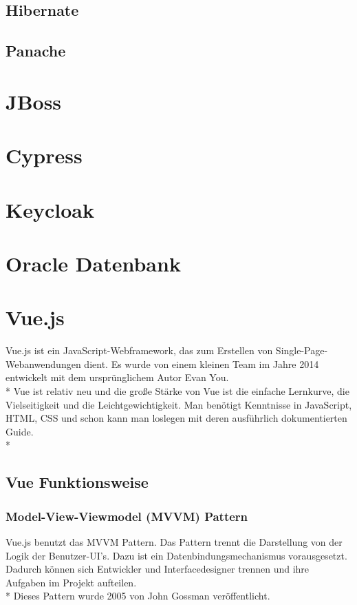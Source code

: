 \subsection{Hibernate}

\subsection{Panache}

\section{JBoss}

\section{Cypress}

\section{Keycloak}
\author{Benjamin Besic}

\section{Oracle Datenbank}

\section{Vue.js}
\author{Benjamin Besic}
Vue.js ist ein JavaScript-Webframework, das zum Erstellen von Single-Page-Webanwendungen dient. 
Es wurde von einem kleinen Team im Jahre 2014 entwickelt mit dem ursprünglichem Autor Evan You.\\* Vue ist relativ neu und die große Stärke
von Vue ist die einfache Lernkurve, die Vielseitigkeit und die Leichtgewichtigkeit. Man benötigt Kenntnisse in JavaScript, HTML, CSS und schon kann man loslegen
mit deren ausführlich dokumentierten Guide\cite{VueGuide}. \cite{VueWissen} \cite{VueWiki}\\*

\subsection{Vue Funktionsweise}

\subsubsection{Model-View-Viewmodel (MVVM) Pattern }
Vue.js benutzt das MVVM Pattern. Das Pattern trennt die Darstellung von der Logik der Benutzer-UI's.
Dazu ist ein Datenbindungsmechanismus vorausgesetzt. Dadurch können sich Entwickler und Interfacedesigner trennen und ihre Aufgaben im Projekt 
aufteilen. \\*
Dieses Pattern wurde 2005 von John Gossman veröffentlicht. \cite{MVVM}

